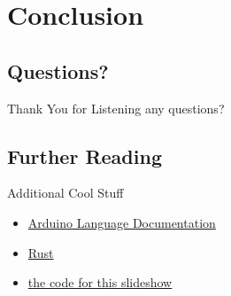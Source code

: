 \documentclass{beamer}
\newcommand{\link}[2]{\href{#1}{\color{blue}#2}}
\begin{document}
	\section{Conclusion}
	\subsection{Questions?}
	\begin{frame}{Thank You for Listening}
		any questions?
	\end{frame}

	\subsection{Further Reading}
	\begin{frame}{Additional Cool Stuff}
		\begin{itemize}
			\item \link{https://www.arduino.cc/reference/en/}{Arduino Language Documentation}
			\item \link{https://www.rust-lang.org/}{Rust}
			\item \link{https://github.com/NHS-Engineering/arduino\_masterclass}{the code for this slideshow}
		\end{itemize}
	\end{frame}
\end{document}
